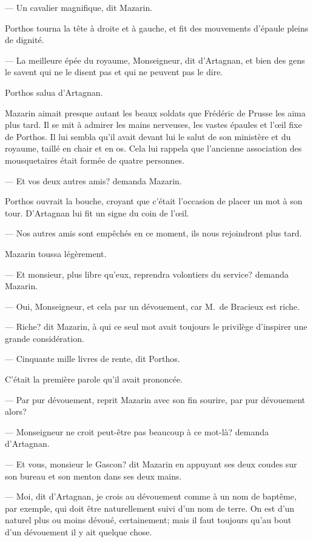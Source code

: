 — Un cavalier magnifique, dit Mazarin.

Porthos tourna la tête à droite et à gauche, et fit des mouvements d'épaule pleins de dignité.

— La meilleure épée du royaume, Monseigneur, dit d'Artagnan, et bien des gens le savent qui ne le disent pas et qui ne peuvent pas le dire.

Porthos salua d'Artagnan.

Mazarin aimait presque autant les beaux soldats que Frédéric de Prusse les aima plus tard. Il se mit à admirer les mains nerveuses, les vastes épaules et l'œil fixe de Porthos. Il lui sembla qu'il avait devant lui le salut de son ministère et du royaume, taillé en chair et en os. Cela lui rappela que l'ancienne association des mousquetaires était formée de quatre personnes.

— Et vos deux autres amis? demanda Mazarin.

Porthos ouvrait la bouche, croyant que c'était l'occasion de placer un mot à son tour. D'Artagnan lui fit un signe du coin de l'œil.

— Nos autres amis sont empêchés en ce moment, ils nous rejoindront plus tard.

Mazarin toussa légèrement.

— Et monsieur, plus libre qu'eux, reprendra volontiers du service? demanda Mazarin.

— Oui, Monseigneur, et cela par un dévouement, car M.~de Bracieux est riche.

— Riche? dit Mazarin, à qui ce seul mot avait toujours le privilège d'inspirer une grande considération.

— Cinquante mille livres de rente, dit Porthos.

C'était la première parole qu'il avait prononcée.

— Par pur dévouement, reprit Mazarin avec son fin sourire, par pur dévouement alors?

— Monseigneur ne croit peut-être pas beaucoup à ce mot-là? demanda d'Artagnan.

— Et vous, monsieur le Gascon? dit Mazarin en appuyant ses deux coudes sur son bureau et son menton dans ses deux mains.

— Moi, dit d'Artagnan, je crois au dévouement comme à un nom de baptême, par exemple, qui doit être naturellement suivi d'un nom de terre. On est d'un naturel plus ou moins dévoué, certainement; mais il faut toujours qu'au bout d'un dévouement il y ait quelque chose.

